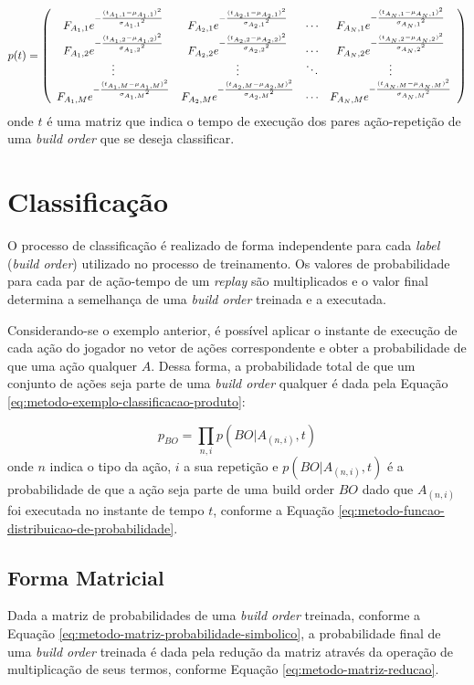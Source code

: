\begin{equation}
	p(t) = \left(
		\begin{array}{cccc}
			 {F_{{A_1,1}}} e^{-\frac{(t_{{A_1,1}}-{\mu_{{A_1,1}}})^2}{{{\sigma_{{A_1,1}}}}^2}}  &  {F_{{A_2,1}}} e^{-\frac{(t_{{A_2,1}}-{\mu_{{A_2,1}}})^2}{{{\sigma_{{A_2,1}}}}^2}}  & \cdots &  {F_{{A_N,1}}} e^{-\frac{(t_{{A_N,1}}-{\mu_{{A_N,1}}})^2}{{{\sigma_{{A_N,1}}}}^2}}  \\
 			 {F_{{A_1,2}}} e^{-\frac{(t_{{A_1,2}}-{\mu_{{A_1,2}}})^2}{{{\sigma_{{A_1,2}}}}^2}}  &  {F_{{A_2,2}}} e^{-\frac{(t_{{A_2,2}}-{\mu_{{A_2,2}}})^2}{{{\sigma_{{A_2,2}}}}^2}}  & \cdots &  {F_{{A_N,2}}} e^{-\frac{(t_{{A_N,2}}-{\mu_{{A_N,2}}})^2}{{{\sigma_{{A_N,2}}}}^2}}  \\
 			\vdots 	  	  & \vdots 	  	  & \ddots & \vdots 	       \\
 			 {F_{{A_1,M}}} e^{-\frac{(t_{{A_1,M}}-{\mu_{{A_1,M}}})^2}{{{\sigma_{{A_1,M}}}}^2}}  &  {F_{{A_2,M}}} e^{-\frac{(t_{{A_2,M}}-{\mu_{{A_2,M}}})^2}{{{\sigma_{{A_2,M}}}}^2}}  & \cdots &  {F_{{A_N,M}}} e^{-\frac{(t_{{A_N,M}}-{\mu_{{A_N,M}}})^2}{{{\sigma_{{A_N,M}}}}^2}} 
		\end{array}
	\right)
	\label{eq:metodo-matriz-probabilidade-simbolico}
\end{equation}
\noindent onde $t$ é uma matriz que indica o tempo de execução dos pares ação-repetição de uma \textit{build order} que se deseja classificar.

		\section{Classificação}
O processo de classificação é realizado de forma independente para cada \textit{label} (\textit{build order}) utilizado no processo de treinamento. Os valores de probabilidade para cada par de ação-tempo de um \textit{replay} são multiplicados e o valor final determina a semelhança de uma \textit{build order} treinada e a executada.

Considerando-se o exemplo anterior, é possível aplicar o instante de execução de cada ação do jogador no vetor de ações correspondente e obter a probabilidade de que uma ação qualquer $A$. Dessa forma, a probabilidade total de que um conjunto de ações seja parte de uma \textit{build order} qualquer é dada pela Equação \ref{eq:metodo-exemplo-classificacao-produto}:

\begin{equation}
	p_{BO} = \prod_{n,i} p(BO|A_{(n,i)}, t)
	\label{eq:metodo-exemplo-classificacao-produto}
\end{equation}
\noindent onde $n$ indica o tipo da ação, $i$ a sua repetição e $p(BO|A_{(n,i)}, t)$ é a probabilidade de que a ação seja parte de uma build order $BO$ dado que $A_{(n,i)}$ foi executada no instante de tempo $t$, conforme a Equação \ref{eq:metodo-funcao-distribuicao-de-probabilidade}.

			\subsection{Forma Matricial}
Dada a matriz de probabilidades de uma \textit{build order} treinada, conforme a Equação \ref{eq:metodo-matriz-probabilidade-simbolico}, a probabilidade final de uma \textit{build order} treinada é dada pela redução da matriz através da operação de multiplicação de seus termos, conforme Equação \ref{eq:metodo-matriz-reducao}.

